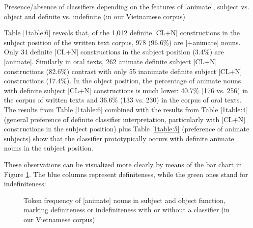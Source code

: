 \documentclass[output=paper]{langsci/langscibook}
\begin{document}
\begin{table}
\caption{Presence/absence of classifiers depending on the features of [\pm animate], subject vs. object and definite vs. indefinite (in our Vietnamese corpus)}\label{1table:6}
\end{table}

Table \ref{1table:6} reveals that, of the 1,012 definite [CL+N] constructions in the subject position of the written text corpus, 978 (96.6\%) are [+animate] nouns. Only 34 definite [CL+N] constructions in the subject position (3.4\%) are [\minus animate]. Similarly in oral texts, 262 animate definite subject [CL+N] constructions (82.6\%) contrast with only 55 inanimate definite subject [CL+N] constructions (17.4\%). In the object position, the percentage of animate nouns with definite subject [CL+N] constructions is much lower: 40.7\% (176 vs. 256) in the corpus of written texts and 36.6\% (133 vs. 230) in the corpus of oral texts. The results from Table \ref{1table:6} combined with the results from Table \ref{1table:4} (general preference of definite classifier interpretation, particularly with [CL+N] constructions in the subject position) plus Table \ref{1table:5} (preference of animate subjects) show that the classifier prototypically occurs with definite animate nouns in the subject position.

These observations can be visualized more clearly by means of the bar chart in Figure \ref{1fig:1}. The blue columns represent definiteness, while the green ones stand for indefiniteness:

\begin{figure}
\dataset
{}

\caption{Token frequency of [\pm animate] nouns in subject and object function, marking definiteness or indefiniteness with or without a classifier (in our Vietnamese corpus)}\label{1fig:1}
\end{figure}
\end{document}
